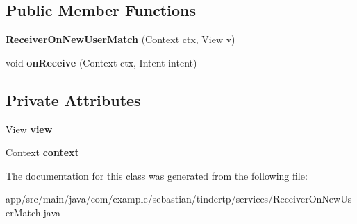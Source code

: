 \subsection*{Public Member Functions}
\begin{DoxyCompactItemize}
\item 
{\bfseries Receiver\+On\+New\+User\+Match} (Context ctx, View v)\hypertarget{classcom_1_1example_1_1sebastian_1_1tindertp_1_1services_1_1ReceiverOnNewUserMatch_aa676e19384b50a2b9046492508034ed6}{}\label{classcom_1_1example_1_1sebastian_1_1tindertp_1_1services_1_1ReceiverOnNewUserMatch_aa676e19384b50a2b9046492508034ed6}

\item 
void {\bfseries on\+Receive} (Context ctx, Intent intent)\hypertarget{classcom_1_1example_1_1sebastian_1_1tindertp_1_1services_1_1ReceiverOnNewUserMatch_af02472c51d2b04b17f641d0bbc45fe5c}{}\label{classcom_1_1example_1_1sebastian_1_1tindertp_1_1services_1_1ReceiverOnNewUserMatch_af02472c51d2b04b17f641d0bbc45fe5c}

\end{DoxyCompactItemize}
\subsection*{Private Attributes}
\begin{DoxyCompactItemize}
\item 
View {\bfseries view}\hypertarget{classcom_1_1example_1_1sebastian_1_1tindertp_1_1services_1_1ReceiverOnNewUserMatch_a6d592189a8b5116a8103728d4d063aac}{}\label{classcom_1_1example_1_1sebastian_1_1tindertp_1_1services_1_1ReceiverOnNewUserMatch_a6d592189a8b5116a8103728d4d063aac}

\item 
Context {\bfseries context}\hypertarget{classcom_1_1example_1_1sebastian_1_1tindertp_1_1services_1_1ReceiverOnNewUserMatch_aed343f4258bf8f53996895815b3f447a}{}\label{classcom_1_1example_1_1sebastian_1_1tindertp_1_1services_1_1ReceiverOnNewUserMatch_aed343f4258bf8f53996895815b3f447a}

\end{DoxyCompactItemize}


The documentation for this class was generated from the following file\+:\begin{DoxyCompactItemize}
\item 
app/src/main/java/com/example/sebastian/tindertp/services/Receiver\+On\+New\+User\+Match.\+java\end{DoxyCompactItemize}
